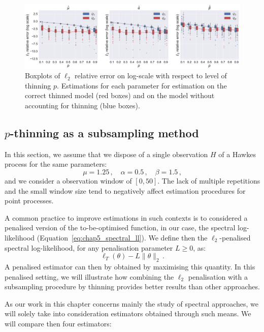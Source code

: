     \begin{figure}[!ht]
        \centering
        \includegraphics[width=1.0\textwidth]{images/chapter5/l2_error_same_information.pdf} 
        \caption{Boxplots of $\ell_2$ relative error on log-scale with respect to level of thinning $p$. Estimations for each parameter for estimation on the correct thinned model (red boxes) and on the model without accounting for thinning (blue boxes).
        }
        \label{fig:chap5_l2_error_same_information}
    \end{figure}

    \subsection{$p$-thinning as a subsampling method}\label{sec:chap5_subsampling_numerical}
    
    In this section, we assume that we dispose of a single observation $H$ of a Hawkes process for the same parameters:
    \[\mu = 1.25\,,\quad \alpha = 0.5\,,\quad \beta = 1.5\,,\]
    and we consider a observation window of $[0, 50]$.
    The lack of multiple repetitions and the small window size tend to negatively affect estimation procedures for point processes.

    A common practice to improve estimations in such contexts is to considered a penalised version of the to-be-optimised function, in our case, the spectral log-likelihood (Equation~\eqref{eq:chap5_spectral_ll}). 
    We define then the $\ell_2$-penalised spectral log-likelihood, for any penalisation parameter $L\geq0$, as:
    \begin{equation}\label{eq:chap5_penalised_ll}
        \ell_{T}(\theta) - L \|\theta\|_2 \,.
    \end{equation}
    A penalised estimator can then by obtained by maximising this quantity.
    In this penalised setting, we will illustrate how combining the $\ell_2$ penalisation with a subsampling procedure by thinning provides better results than other approaches.

    As our work in this chapter concerns mainly the study of spectral approaches, we will solely take into consideration estimators obtained through such means.
    We will compare then four estimators:
    
